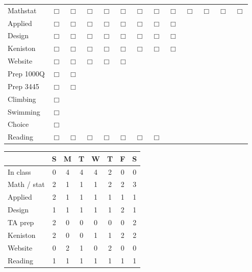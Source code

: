 \documentclass{article}
\begin{document}
\begin{table}
\centering
\begin{tabular}{lcccccccccccc}
Mathstat & $\Box$ & $\Box$ & $\Box$ & $\Box$ & $\Box$ & $\Box$ &
                                                                 $\Box$ & $\Box$ & $\Box$ & $\Box$ & $\Box$ & $\Box$ \\
Applied & $\Box$ & $\Box$ & $\Box$ & $\Box$ & $\Box$ & $\Box$ & $\Box$ & $\Box$
  & & & & \\
Design & $\Box$ & $\Box$ & $\Box$ & $\Box$ & $\Box$ & $\Box$ & $\Box$ & $\Box$
  & & & & \\
\midrule Keniston & $\Box$ & $\Box$ & $\Box$ & $\Box$ & $\Box$ & $\Box$ &
                                                                 $\Box$ & $\Box$
  & & & \\
Website & $\Box$ & $\Box$ & $\Box$ & $\Box$ & $\Box$ & & & & & & & \\
Prep 1000Q & $\Box$ & $\Box$ & & & & & & & & & & \\
Prep 3445 & $\Box$ & $\Box$ & & & & & & & & & & \\
\midrule
Climbing & $\Box$ & & & & & & & & & & & \\
Swimming & $\Box$ & & & & & & & & & & & \\
Choice & $\Box$ & & & & & & & & & & & \\
\midrule
Reading & $\Box$ & $\Box$ & $\Box$ & $\Box$ & $\Box$ & $\Box$ & $\Box$
  & & & & & \\
\end{tabular}
\end{table}

\begin{table}
\centering
\begin{tabular}{lccccccc}
 & S & M & T & W & T & F & S \\
\midrule
In class & 0 & 4 & 4 & 4 & 2 & 0 & 0 \\
\midrule
Math / stat & 2 & 1 & 1 & 1 & 2 & 2 & 3 \\
Applied & 2 & 1 & 1 & 1 & 1 & 1 & 1 \\
Design & 1 & 1 & 1 & 1 & 1  & 2 & 1 \\
\midrule
TA prep & 2 & 0 & 0 & 0 & 0 & 0 & 2 \\
Keniston & 2 & 0 & 0 & 1 & 1 & 2 & 2 \\
Website & 0 & 2 & 1 & 0 & 2 & 0 & 0 \\
\midrule
Reading & 1 & 1 & 1 & 1 & 1 & 1 & 1
\end{tabular}
\end{table}
\end{document}
